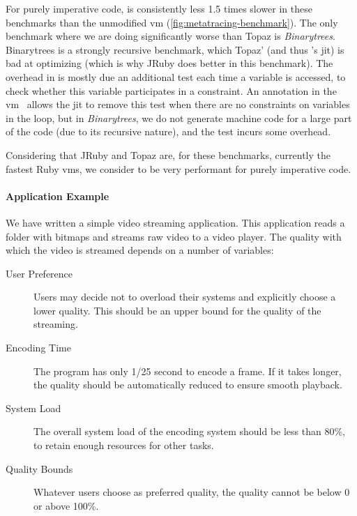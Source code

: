For purely imperative code, \toolname is consistently less 1.5 times
slower in these benchmarks than the unmodified \ac{vm}
(\autoref{fig:metatracing-benchmark}). The only benchmark where we are
doing significantly worse than Topaz is
\emph{Binarytrees}. Binarytrees is a strongly recursive benchmark,
which Topaz' (and thus \toolname's \ac{jit}) is bad at optimizing
(which is why JRuby does better in this benchmark). The overhead in
\toolname is mostly due an additional test each time a variable is
accessed, to check whether this variable participates in a
constraint. An annotation in the \ac{vm}~\cite{bolz2011runtime} allows
the \ac{jit} to remove this test when there are no constraints on
variables in the loop, but in \emph{Binarytrees}, we do not generate
machine code for a large part of the code (due to its recursive
nature), and the test incurs some overhead.

Considering that JRuby and Topaz are, for these benchmarks, currently
the fastest Ruby \acp{vm}, we consider \toolname to be very performant
for purely imperative code.  

\paragraph{Application Example}
We have written a simple video streaming application. This application
reads a folder with bitmaps and streams raw video to a video
player. The quality with which the video is streamed depends on a
number of variables:
\begin{description}
\item[User Preference] Users may decide not to overload their systems
  and explicitly choose a lower quality. This should be an upper
  bound for the quality of the streaming.
\item[Encoding Time] The program has only 1/25 second to encode a
  frame. If it takes longer, the quality should be automatically
  reduced to ensure smooth playback.
\item[System Load] The overall system load of the encoding system
  should be less than 80\%, to retain enough resources for other tasks.
\item[Quality Bounds] Whatever users choose as preferred quality, the
  quality cannot be below 0 or above 100\%.
\end{description}

